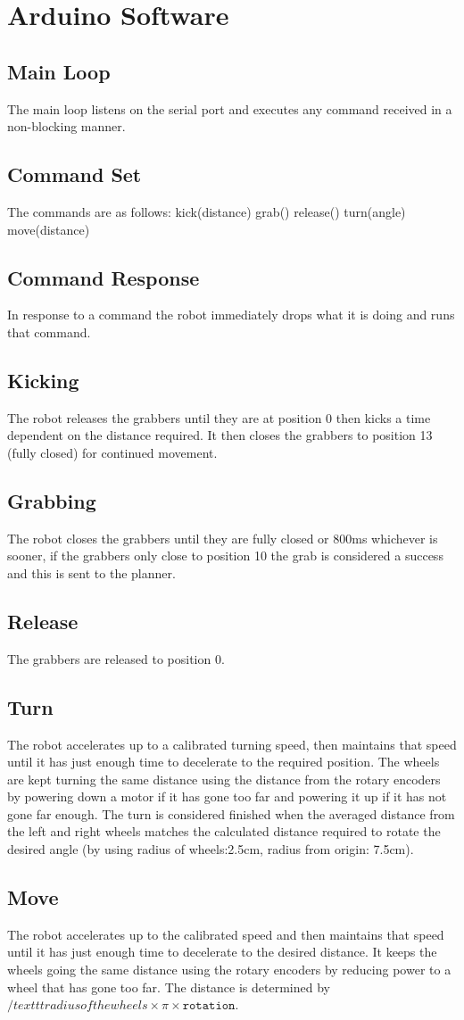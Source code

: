 
\section{Arduino Software}
\subsection{Main Loop}
The main loop listens on the serial port and executes any command received in a non-blocking manner. 
\subsection{Command Set}
The commands are as follows:
kick(distance)
grab()
release()
turn(angle)
move(distance)
\subsection{Command Response}
In response to a command the robot immediately drops what it is doing and runs that command. 
\subsection{Kicking}
The robot releases the grabbers until they are at position 0 then kicks a time dependent on the distance required. It then closes the grabbers to position 13 (fully closed) for continued movement.
\subsection{Grabbing}
The robot closes the grabbers until they are fully closed or 800ms whichever is sooner, if the grabbers only close to position 10 the grab is considered a success and this is sent to the planner. 
\subsection{Release}
The grabbers are released to position 0.
\subsection{Turn}
The robot accelerates up to a calibrated turning speed, then maintains that speed until it has just enough time to decelerate to the required position. The wheels are kept turning the same distance using the distance from the rotary encoders by powering down a motor if it has gone too far and powering it up if it has not gone far enough. The turn is considered finished when the averaged distance from the left and right wheels matches the calculated distance required to rotate the desired angle (by using radius of wheels:2.5cm, radius from origin: 7.5cm). 
\subsection{Move}
The robot accelerates up to the calibrated speed and then maintains that speed until it has just enough time to decelerate to the desired distance. It keeps the wheels going the same distance using the rotary encoders by reducing power to a wheel that has gone too far. The distance is determined by $/texttt{radius of the wheels} \times \pi \times \texttt{rotation}$. 
